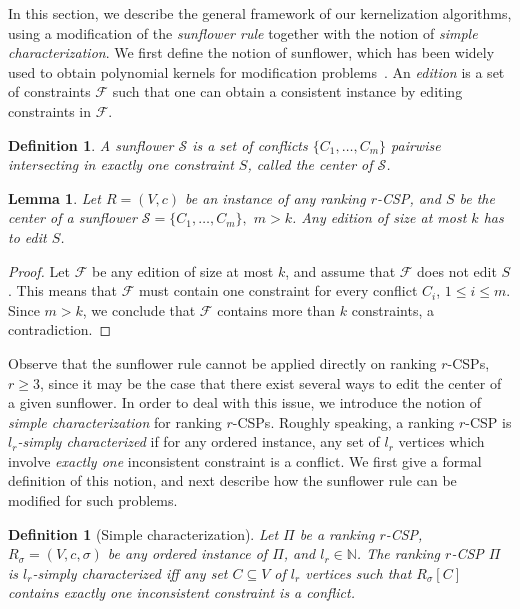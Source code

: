 \documentclass[11pt]{article}
\newtheorem{definition}[theorem]{Definition}
\newtheorem{lemma}[theorem]{Lemma}
\begin{document}
In this section, we describe the general framework of our kernelization algorithms, using a modification of the \emph{sunflower rule} together with the notion of \emph{simple characterization}. We first define the notion of sunflower, which has been widely used to obtain polynomial kernels for modification problems~\cite{Abu10,ALS09,BP11,GHPP12}.
An \emph{edition} is a set of constraints $\mathcal{F}$ such that one can obtain a consistent instance by editing constraints in $\mathcal{F}$.  

\begin{definition}
	A \emph{sunflower} $\mathcal{S}$ is a set of conflicts $\{C_1, \ldots, C_m\}$ pairwise intersecting in \emph{exactly one} constraint $S$, called the \emph{center} of $\mathcal{S}$.
\end{definition} 

\begin{lemma}
\label{lem:flower}
	Let $R = (V, c)$ be an instance of any ranking $r$-CSP, and $S$ be the center of a sunflower $\mathcal{S} = \{C_1, \ldots, C_m\},$ $m > k$. Any edition of size at most $k$ has to edit $S$.
\end{lemma}

\begin{proof}
	Let $\mathcal{F}$ be any edition of size at most $k$, and assume that $\mathcal{F}$ does not edit $S$. This means that $\mathcal{F}$ must contain one constraint for every conflict $C_i$, $1 \leqslant i \leqslant m$. Since $m > k$, we conclude that $\mathcal{F}$ contains more than $k$ constraints, a contradiction.
 \end{proof}

Observe that the sunflower rule cannot be applied directly on ranking $r$-CSPs, $r \geqslant 3$, since it may be the case that there exist several ways to edit the center of a given sunflower. In order to deal with this issue, we introduce the notion of \emph{simple characterization} for ranking $r$-CSPs. 
Roughly speaking, a ranking $r$-CSP is \emph{$l_r$-simply characterized} if for any ordered instance, any set of $l_r$ vertices which involve \emph{exactly one} inconsistent constraint is a conflict. We first give a formal definition of this notion, and next describe how the sunflower rule can be modified for such problems. 

\begin{definition}[Simple characterization]
\label{def:simplecharac}
	Let $\Pi$ be a ranking $r$-CSP, $R_\sigma 
	= (V, c, \sigma)$ be any ordered instance of $\Pi$, and $l_r \in \mathbb{N}$. The ranking $r$-CSP $\Pi$ is \emph{$l_r$-simply characterized} iff any set $C \subseteq V$ of $l_r$ vertices such that $R_\sigma[C]$ contains exactly one inconsistent constraint is a conflict. 
	
\end{definition}
\end{document}
